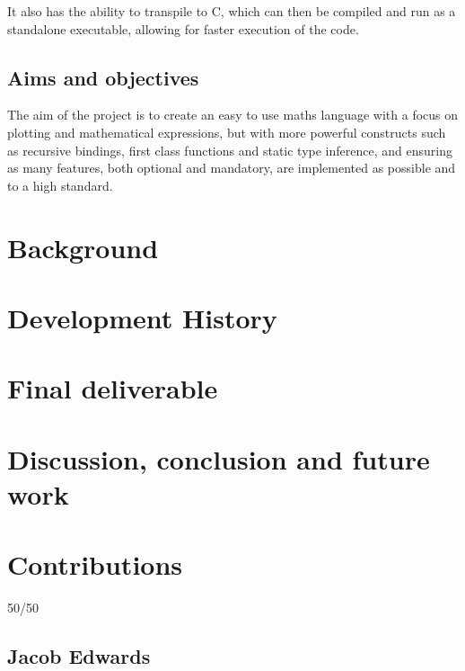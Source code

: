\documentclass[a4paper, oneside, 11pt]{report}
\begin{document}
It also has the ability to transpile to C, which can then be compiled and run as a standalone executable, allowing for
faster execution of the code.

\section{Aims and objectives}\label{sec:aims-and-objectives}

The aim of the project is to create an easy to use maths language with a focus on plotting and mathematical
expressions, but with more powerful constructs such as recursive bindings, first class functions and static type 
inference, and ensuring as many features, both optional and mandatory, are implemented as possible and to a high 
standard.

\chapter{Background}\label{ch:background}

\chapter{Development History}\label{ch:devhist}



\chapter{Final deliverable}\label{ch:impl}



\chapter{Discussion, conclusion and future work}\label{ch:discussion-conclusion-and-future-work}




\appendix
\chapter{Contributions}\label{ch:contributions}

50/50

\section{Jacob Edwards}\label{sec:jacob-edwards}
\end{document}
